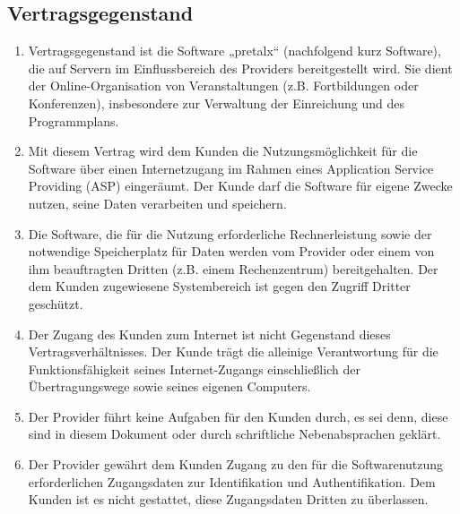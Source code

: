 \documentclass{terms}
\begin{document}
\subsection{Vertragsgegenstand}
\begin{enumerate}
\item Vertragsgegenstand ist die Software „pretalx“ (nachfolgend kurz Software), die auf Servern im Einflussbereich des Providers bereitgestellt wird.
      Sie dient der Online-Organisation von Veranstaltungen (z.B. Fortbildungen oder Konferenzen), insbesondere zur Verwaltung der Einreichung und des Programmplans.
\item Mit diesem Vertrag wird dem Kunden die Nutzungsmöglichkeit für die Software über einen Internetzugang im Rahmen eines Application Service Providing (ASP) eingeräumt.
      Der Kunde darf die Software für eigene Zwecke nutzen, seine Daten verarbeiten und speichern.
\item Die Software, die für die Nutzung erforderliche Rechnerleistung sowie der notwendige Speicherplatz für Daten werden vom Provider oder einem von ihm beauftragten Dritten (z.B. einem Rechenzentrum) bereitgehalten.
      Der dem Kunden zugewiesene Systembereich ist gegen den Zugriff Dritter geschützt.
\item Der Zugang des Kunden zum Internet ist nicht Gegenstand dieses Vertragsverhältnisses.
      Der Kunde trägt die alleinige Verantwortung für die Funktionsfähigkeit seines Internet-Zugangs einschließlich der Übertragungswege sowie seines eigenen Computers.
\item Der Provider führt keine Aufgaben für den Kunden durch, es sei denn, diese sind in diesem Dokument oder durch schriftliche Nebenabsprachen geklärt.
\item Der Provider gewährt dem Kunden Zugang zu den für die Softwarenutzung erforderlichen Zugangsdaten zur Identifikation und Authentifikation.
      Dem Kunden ist es nicht gestattet, diese Zugangsdaten Dritten zu überlassen.
\end{enumerate}
\end{document}
